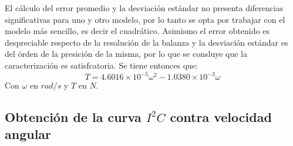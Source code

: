 \documentclass[main]{subfiles}
\begin{document}
El c\'alculo del error promedio y la desviaci\'on est\'andar no presenta diferencias significativas para uno y otro modelo, por lo tanto se opta por trabajar con el modelo m\'as sencillo, es decir el cuadr\'atico. Asimismo el error obtenido es despreciable respecto de la resoluci\'on de la balanza y la desviaci\'on est\'andar es del \'orden de la presici\'on de la misma, por lo que se consluye que la caracterizaci\'on es satisfcatoria. Se tiene entonces que:
\begin{equation}
T=4.6016\times10^{-5}\omega^2-1.0380\times10^{-3}\omega
\end{equation}
Con $\omega$ en $rad/s$ y $T$ en $N$.
\begin{figure}[H]
  \vspace{-20pt}
\hspace{-50pt}
  \vspace{-5pt}
  \caption{}  
  \vspace{-10pt}
\end{figure}

\subsection{Obtenci\'on de la curva $I^2C$ contra velocidad angular}
\end{document}
